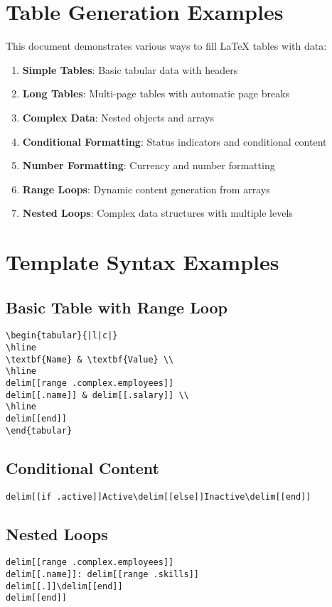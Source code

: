 \documentclass{article}
\begin{document}
\section{Table Generation Examples}

This document demonstrates various ways to fill LaTeX tables with data:

\begin{enumerate}
\item \textbf{Simple Tables}: Basic tabular data with headers
\item \textbf{Long Tables}: Multi-page tables with automatic page breaks
\item \textbf{Complex Data}: Nested objects and arrays
\item \textbf{Conditional Formatting}: Status indicators and conditional content
\item \textbf{Number Formatting}: Currency and number formatting
\item \textbf{Range Loops}: Dynamic content generation from arrays
\item \textbf{Nested Loops}: Complex data structures with multiple levels
\end{enumerate}

\section{Template Syntax Examples}

\subsection{Basic Table with Range Loop}
\begin{verbatim}
\begin{tabular}{|l|c|}
\hline
\textbf{Name} & \textbf{Value} \\
\hline
delim[[range .complex.employees]]
delim[[.name]] & delim[[.salary]] \\
\hline
delim[[end]]
\end{tabular}
\end{verbatim}

\subsection{Conditional Content}
\begin{verbatim}
delim[[if .active]]Active\delim[[else]]Inactive\delim[[end]]
\end{verbatim}

\subsection{Nested Loops}
\begin{verbatim}
delim[[range .complex.employees]]
delim[[.name]]: delim[[range .skills]]
delim[[.]]\delim[[end]]
delim[[end]]
\end{verbatim}
\end{document}

